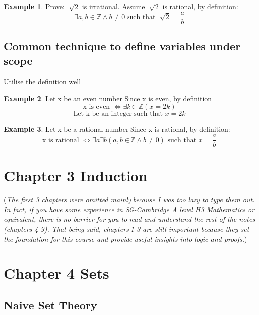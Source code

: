 \documentclass[14pt]{article}
\theoremstyle{definition}
\newtheorem*{example}{Example}
\begin{document}
\begin{example}
    Prove: \(\sqrt[]{2}\) is irrational.
    Assume \(\sqrt[]{2}\) is rational, by definition:
    \[\exists a, b \in \mathbb{Z} \land b \neq 0 \text{ such that }\sqrt[]{2} = \frac{a}{b}\]
\end{example}

\subsubsection{}
\subsubsection{}
\newpage
\subsection*{Common technique to define variables under scope}
Utilise the definition well

\begin{example}
    Let x be an even number
    Since x is even, by definition 
    \[\text{x is even } \iff \exists k \in \mathbb{Z} (x = 2k)\]
    \[\text{Let k be an integer such that } x = 2k\]
\end{example}

\begin{example}
    Let x be a rational number
    Since x is rational, by definition:
    \[\text{x is rational } \iff \exists a \exists b (a, b \in \mathbb{Z} \land b \neq 0) \text{ such that } x = \frac{a}{b}\]
\end{example}

\section{Chapter 3 Induction}

(\textit{The first 3 chapters were omitted mainly because I was too lazy to type them out.
In fact, if you have some experience in SG-Cambridge A level H3 Mathematics or equivalent, 
there is no barrier for you to read and understand the rest of the notes (chapters
4-9). That being said,
chapters 1-3 are still important because they set the foundation for 
this course and provide useful insights into logic and proofs.})

\section{Chapter 4 Sets}
\subsection{Naive Set Theory}
\end{document}
